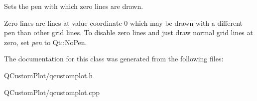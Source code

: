 Sets the pen with which zero lines are drawn.

Zero lines are lines at value coordinate 0 which may be drawn with a different pen than other grid lines. To disable zero lines and just draw normal grid lines at zero, set {\itshape pen} to Qt\+::\+No\+Pen. 

The documentation for this class was generated from the following files\+:\begin{DoxyCompactItemize}
\item 
Q\+Custom\+Plot/qcustomplot.\+h\item 
Q\+Custom\+Plot/qcustomplot.\+cpp\end{DoxyCompactItemize}
